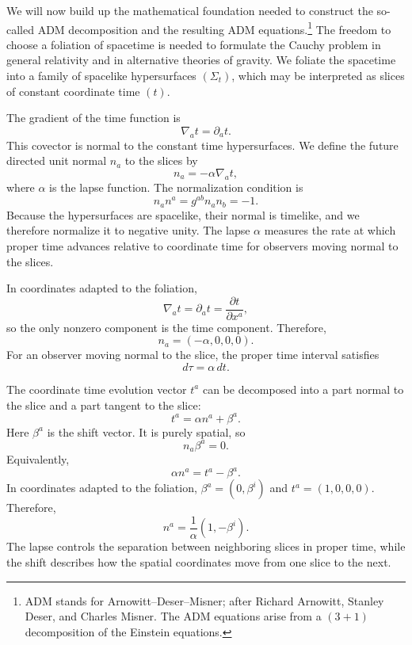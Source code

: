 We will now build up the mathematical foundation needed to construct the so-called ADM decomposition and the resulting ADM equations.\footnote{ADM stands for Arnowitt--Deser--Misner; after Richard Arnowitt, Stanley Deser, and Charles Misner. The ADM equations arise from a $(3+1)$ decomposition of the Einstein equations.} The freedom to choose a foliation of spacetime is needed to formulate the Cauchy problem in general relativity and in alternative theories of gravity. We foliate the spacetime into a family of spacelike hypersurfaces $(\Sigma_t)$, which may be interpreted as slices of constant coordinate time $(t)$.

The gradient of the time function is
\begin{equation}
\nabla_a t = \partial_a t .
\end{equation}
This covector is normal to the constant time hypersurfaces. We define the future directed unit normal $n_a$ to the slices by
\begin{equation}
n_a = -\alpha \nabla_a t ,
\end{equation}
where $\alpha$ is the lapse function. The normalization condition is
\begin{equation}
n_a n^a = g^{ab}n_a n_b = -1 .
\end{equation}
Because the hypersurfaces are spacelike, their normal is timelike, and we therefore normalize it to negative unity. The lapse $\alpha$ measures the rate at which proper time advances relative to coordinate time for observers moving normal to the slices.

In coordinates adapted to the foliation,
\begin{equation}
\nabla_a t = \partial_a t = \frac{\partial t}{\partial x^a},
\end{equation}
so the only nonzero component is the time component. Therefore,
\begin{equation}
n_a = (-\alpha,0,0,0).
\end{equation}
For an observer moving normal to the slice, the proper time interval satisfies
\begin{equation}
d\tau = \alpha\,dt .
\end{equation}

The coordinate time evolution vector $t^a$ can be decomposed into a part normal to the slice and a part tangent to the slice:
\begin{equation}
t^a = \alpha n^a + \beta^a .
\end{equation}
Here $\beta^a$ is the shift vector. It is purely spatial, so
\begin{equation}
n_a\beta^a=0 .
\end{equation}
Equivalently,
\begin{equation}
\alpha n^a = t^a - \beta^a .
\label{eq:normal}
\end{equation}
In coordinates adapted to the foliation, $\beta^a=(0,\beta^i)$ and $t^a=(1,0,0,0)$. Therefore,
\begin{equation}
n^a = \frac{1}{\alpha}(1,-\beta^i).
\end{equation}
The lapse controls the separation between neighboring slices in proper time, while the shift describes how the spatial coordinates move from one slice to the next.

